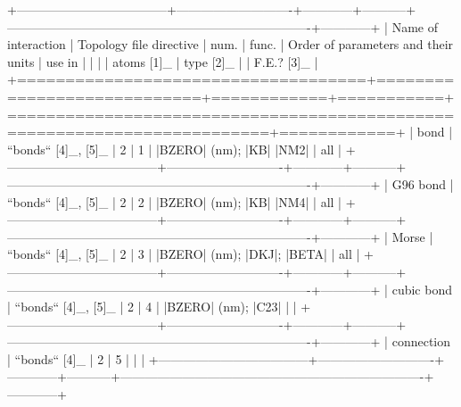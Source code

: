             +------------------------------------+----------------------------+------------+-----------+-------------------------------------------------------------------------+------------+
            | Name of interaction                | Topology file directive    | num.       | func.     | Order of parameters and their units                                     | use in     | 
            |                                    |                            | atoms [1]_ | type [2]_ |                                                                         | F.E.? [3]_ |
            +====================================+============================+============+===========+=========================================================================+============+
            | bond                               | ``bonds`` [4]_, [5]_       | 2          | 1         | |BZERO| (nm); |KB| |NM2|                                                | all        | 
            +------------------------------------+----------------------------+------------+-----------+-------------------------------------------------------------------------+------------+
            | G96 bond                           | ``bonds`` [4]_, [5]_       | 2          | 2         | |BZERO| (nm); |KB| |NM4|                                                | all        |
            +------------------------------------+----------------------------+------------+-----------+-------------------------------------------------------------------------+------------+
            | Morse                              | ``bonds`` [4]_, [5]_       | 2          | 3         | |BZERO| (nm); |DKJ|; |BETA|                                             | all        | 
            +------------------------------------+----------------------------+------------+-----------+-------------------------------------------------------------------------+------------+
            | cubic bond                         | ``bonds`` [4]_, [5]_       | 2          | 4         | |BZERO| (nm); |C23|                                                     |            | 
            +------------------------------------+----------------------------+------------+-----------+-------------------------------------------------------------------------+------------+
            | connection                         | ``bonds`` [4]_             | 2          | 5         |                                                                         |            | 
            +------------------------------------+----------------------------+------------+-----------+-------------------------------------------------------------------------+------------+

